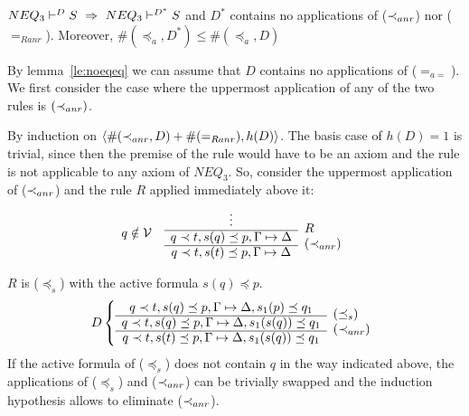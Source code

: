 %
\begin{LEMMA}\label{le:noar}\label{le:noRanr} 
${NEQ_3}\vdash^{{D}}S\ \mathrel\Rightarrow\ {NEQ_3}\vdash^{{D^*}}S$
and $D^*$ contains no applications of ($\mathbin{\prec}_{anr}$) nor ($=_{Ranr}$).
Moreover, $\#(\preceq_a,D^*)\leq\#(\preceq_a,D)$ 
\end{LEMMA}
\begin{PROOF}
By lemma~\ref{le:noeqeq} we can assume that $D$ contains no applications of
($=_{a=}$). We first consider the case where the uppermost application of any of the
two rules is $(\mathbin{\prec}_{anr})$.

By induction on $\langle\#(\mathbin{\prec}_{anr},D)+\#(=_{Ranr}),h(D)\rangle$.
The basis
case of $h(D)=1$ is trivial, since then the premise of the rule
would have to be an axiom and the rule is not applicable to any axiom of $NEQ_3$.
So, consider the uppermost application of ($\mathbin{\prec}_{anr}$) and the rule $R$ applied
immediately above it:
\[ q\notin \cal V\ \ \ \begin{array}{cl}
  \vdots & \raisebox{-1.2ex}[1.5ex][0ex]{$R$} \\ \cline{1-1}
  q\prec t,s(q)\preceq p,\Gamma\Seq\Delta &
  \raisebox{-1.2ex}[1.5ex][0ex]{($\prec_{anr}$)} \\ \cline{1-1}
  q\prec t,s(t)\preceq p,\Gamma\Seq\Delta &
\end{array} \]
%
\begin{LS}
\item $R$ is ($\preceq_s$) with the active formula $s(q)\preceq p$. 
  \[D \left\{ \begin{array}{cl}
 q\prec t,s(q)\preceq p,\Gamma \Seq \Delta,s_1(p)\preceq q_1  &
  \raisebox{-1.2ex}[1.5ex][0ex]{$(\preceq_s)$} \\ \cline{1-1}
 q\prec t,s(q)\preceq p,\Gamma \Seq \Delta, s_1(s(q))\preceq q_1  &
\raisebox{-1.2ex}[1.5ex][0ex]{$(\prec_{anr})$} \\ \cline{1-1}
 q\prec t,s(t)\preceq p,\Gamma \Seq\Delta, s_1(s(q))\preceq q_1
\end{array} \right. \]
If the active formula of ($\preceq_s$) does not contain $q$ in the way 
indicated above, the applications of ($\preceq_s$) and ($\mathbin{\prec}_{anr}$) can be
trivially swapped and the induction hypothesis allows to eliminate 
($\mathbin{\prec}_{anr}$). 


\end{LS}
\end{PROOF}
